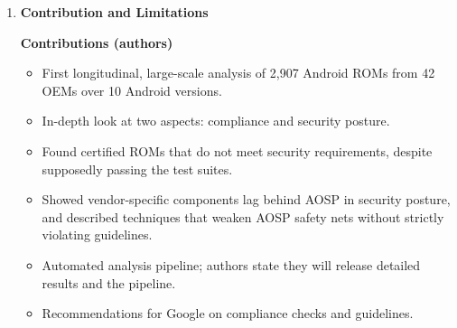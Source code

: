 \documentclass[11pt,a4paper]{article}
\newcommand{\entrypart}[1]{\textbf{\color{accent}#1}\par\vspace{2pt}}
\begin{document}
\begin{enumerate}
\begin{itemize}[leftmargin=*,itemsep=1pt,topsep=2pt]
\begin{itemize}[itemsep=0pt]
            \item \textbf{Case:} 18 ROMs (2 vendors) start \texttt{tcpdump} at boot as root, saving the first 134 bytes of each packet on all interfaces; some use \texttt{tcpdump} 4.9.2 (2017, several CVEs, some with public PoCs); also found in an Android One ROM built in 2019.
        \end{itemize}
        \item \textbf{SELinux customization:}
        \begin{itemize}[itemsep=0pt]
            \item SDK 27: AOSP policy averages 10,000 rules, some vendors over 232,000 (over 20x).
            \item More than 130,000 permission changes to AOSP core policy in SDK 27.
            \item \texttt{isolated\_app}: 58,776 changes (1,375 unique). \texttt{untrusted\_app}: 95,577 changes (4,228 unique).
            \item Examples: SDK 19, 44 ROMs let \texttt{isolated\_app} read/write/ioctl kernel drivers; SDK 23 and 25 rule lets \texttt{isolated\_app} open, read, write app data files (breaks a \texttt{neverallow}); SDK 27 rule lets \texttt{untrusted\_app} read files with the device MAC address.
            \item Motorola: one policy change reverted the \texttt{vold} mitigation, allowing root (cited case).
        \end{itemize}
        \item \textbf{Authors' recommendations:} more automated checks, more accurate existing checks, extend the CDD to discourage risky customizations.
    \end{itemize}

    \item \entrypart{Contribution and Limitations}

    \textbf{Contributions (authors)}
    \begin{itemize}[leftmargin=*,itemsep=1pt,topsep=2pt]
        \item First longitudinal, large-scale analysis of 2,907 Android ROMs from 42 OEMs over 10 Android versions.
        \item In-depth look at two aspects: compliance and security posture.
        \item Found certified ROMs that do not meet security requirements, despite supposedly passing the test suites.
        \item Showed vendor-specific components lag behind AOSP in security posture, and described techniques that weaken AOSP safety nets without strictly violating guidelines.
        \item Automated analysis pipeline; authors state they will release detailed results and the pipeline.
        \item Recommendations for Google on compliance checks and guidelines.
    \end{itemize}


\end{enumerate}
\end{document}
